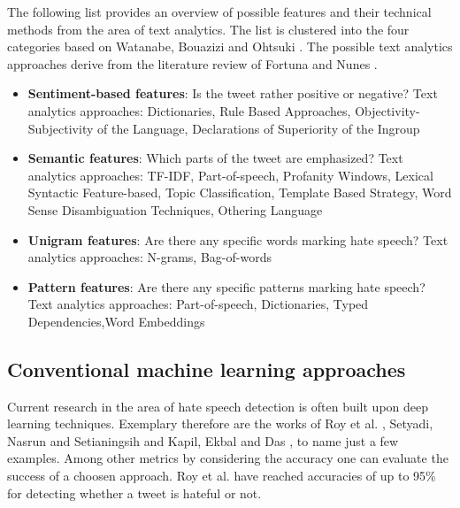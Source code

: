 \noindent
The following list provides an overview of possible features and their technical methods from the area of text analytics. The list is clustered into the four categories based on Watanabe, Bouazizi and Ohtsuki \cite{Watanabe.2018}. The possible text analytics approaches derive from the literature review of Fortuna and Nunes \cite{Fortuna.2018}.
\begin{itemize}
	\item \textbf{Sentiment-based features}: Is the tweet rather positive or negative? \newline
	Text analytics approaches: Dictionaries, Rule Based Approaches, Ob\-jec\-ti\-vi\-ty-Subjectivity of the Language, Declarations of Superiority of the Ingroup \cite{Fortuna.2018}
	\item \textbf{Semantic features}: Which parts of the tweet are emphasized? \newline
	Text analytics approaches: TF-IDF, Part-of-speech, Profanity Windows, Lexical Syntactic Feature-based, Topic Classification, Template Based Strategy, Word Sense Disambiguation Techniques, Othering Language \cite{Fortuna.2018}
	\item \textbf{Unigram features}: Are there any specific words marking hate speech? \newline
	Text analytics approaches: N-grams, Bag-of-words \cite{Fortuna.2018}
	\item \textbf{Pattern features}: Are there any specific patterns marking hate speech? \newline
	Text analytics approaches: Part-of-speech, Dictionaries, Typed De\-pen\-den\-cies,Word Embeddings \cite{Fortuna.2018}
\end{itemize}


\subsection{Conventional machine learning approaches}

Current research in the area of hate speech detection is often built upon deep learning techniques. Exemplary therefore are the works of Roy et al. \cite{Roy.2020}, Setyadi, Nasrun and Setianingsih \cite{NabiilaAdaniSetyadi.2018} and Kapil, Ekbal and Das \cite{Kapil.2020}, to name just a few examples. Among other metrics by considering the accuracy one can evaluate the success of a choosen approach. Roy et al. \cite{Roy.2020} have reached accuracies of up to 95\% for detecting whether a tweet is hateful or not.

